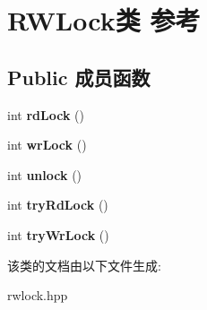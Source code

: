 \hypertarget{classRWLock}{}\section{R\+W\+Lock类 参考}
\label{classRWLock}
\subsection*{Public 成员函数}
\begin{DoxyCompactItemize}
\item 
\mbox{\label{classRWLock_a1ccd8fe0bf4931521e08df92f4662b2a}} 
int {\bfseries rd\+Lock} ()
\item 
\mbox{\label{classRWLock_a6b034d61e35cce6702f284110f33ebdb}} 
int {\bfseries wr\+Lock} ()
\item 
\mbox{\label{classRWLock_ace8dce3640aa69fac39229a1096f064f}} 
int {\bfseries unlock} ()
\item 
\mbox{\label{classRWLock_add87a7653a66092f1584fba8e3d75bc2}} 
int {\bfseries try\+Rd\+Lock} ()
\item 
\mbox{\label{classRWLock_a6a1b5fddaede8469cd774f20a93d7136}} 
int {\bfseries try\+Wr\+Lock} ()
\end{DoxyCompactItemize}


该类的文档由以下文件生成\+:\begin{DoxyCompactItemize}
\item 
rwlock.\+hpp\end{DoxyCompactItemize}

